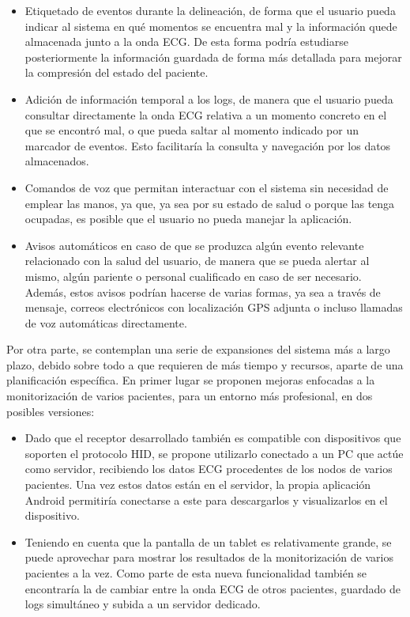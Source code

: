 	\begin{itemize}
		\item Etiquetado de eventos durante la delineación, de forma que el usuario pueda indicar al sistema en qué momentos se encuentra mal y la información quede almacenada junto a la onda ECG. De esta forma podría estudiarse posteriormente la información guardada de forma más detallada para mejorar la compresión del estado del paciente.
		\item Adición de información temporal a los logs, de manera que el usuario pueda consultar
			directamente la onda ECG relativa a un momento concreto en el que se encontró mal, o que
			pueda saltar al momento indicado por un marcador de eventos. Esto facilitaría la consulta
			y navegación por los datos almacenados.
		\item Comandos de voz que permitan interactuar con el sistema sin necesidad de emplear las
			manos, ya que, ya sea por su estado de salud o porque las tenga ocupadas, es posible que
			el usuario no pueda manejar la aplicación.
		\item Avisos automáticos en caso de que se produzca algún evento relevante relacionado con la
			salud del usuario, de manera que se pueda alertar al mismo, algún pariente o personal
			cualificado en caso de ser necesario. Además, estos avisos podrían hacerse de varias
			formas, ya sea a través de mensaje, correos electrónicos con localización GPS adjunta o
			incluso llamadas de voz automáticas directamente.
	\end{itemize}

	Por otra parte, se contemplan una serie de expansiones del sistema más a largo plazo, debido sobre
	todo a que requieren de más tiempo y recursos, aparte de una planificación específica. En primer
	lugar se proponen mejoras enfocadas a la monitorización de varios pacientes, para un entorno más
	profesional, en dos posibles versiones:

	\begin{itemize}
		\item Dado que el receptor desarrollado también es compatible con dispositivos que soporten el
			protocolo HID, se propone utilizarlo conectado a un PC que actúe como servidor, recibiendo
			los datos ECG procedentes de los nodos de varios pacientes. Una vez estos datos están en
			el servidor, la propia aplicación Android permitiría conectarse a este para descargarlos
			y visualizarlos en el dispositivo.
		\item Teniendo en cuenta que la pantalla de un tablet es relativamente grande, se puede
			aprovechar para mostrar los resultados de la monitorización de varios pacientes a la vez.
			Como parte de esta nueva funcionalidad también se encontraría la de cambiar entre la onda
			ECG de otros pacientes, guardado de logs simultáneo y subida a un servidor dedicado.
	\end{itemize}

